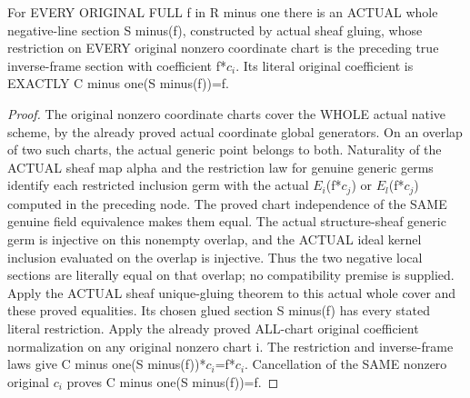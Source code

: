 \begin{theorem}
\label{thm:seven-native-original-negative-global-sections}
\leanok
For EVERY ORIGINAL FULL f in R minus one there is an ACTUAL whole
negative-line section S minus(f), constructed by actual sheaf gluing,
whose restriction on EVERY original nonzero coordinate chart is the
preceding true inverse-frame section with coefficient f*$c_i$. Its literal
original coefficient is EXACTLY C minus one(S minus(f))=f.
\end{theorem}
\begin{proof}
The original nonzero coordinate charts cover the WHOLE actual native
scheme, by the already proved actual coordinate global generators.
On an overlap of two such charts, the actual generic point belongs to
both. Naturality of the ACTUAL sheaf map alpha and the restriction law
for genuine generic germs identify each restricted inclusion germ with
the actual $E_i$(f*$c_j$) or $E_l$(f*$c_j$) computed in the preceding node.
The proved chart independence of the SAME genuine field equivalence
makes them equal. The actual structure-sheaf generic germ is injective
on this nonempty overlap, and the ACTUAL ideal kernel inclusion evaluated
on the overlap is injective. Thus the two negative local sections are
literally equal on that overlap; no compatibility premise is supplied.
Apply the ACTUAL sheaf unique-gluing theorem to this actual whole cover
and these proved equalities. Its chosen glued section S minus(f) has
every stated literal restriction. Apply the already proved ALL-chart
original coefficient normalization on any original nonzero chart i.
The restriction and inverse-frame laws give
C minus one(S minus(f))*$c_i$=f*$c_i$. Cancellation of the SAME nonzero
original $c_i$ proves C minus one(S minus(f))=f.
\end{proof}


